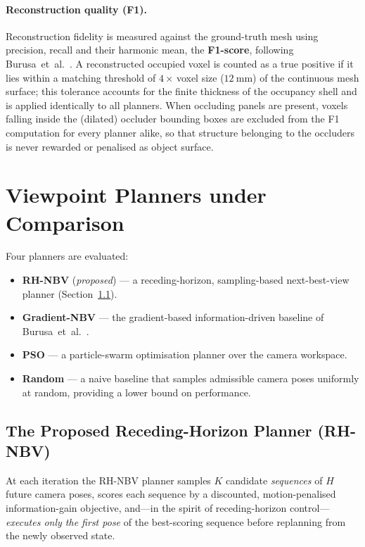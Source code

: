 \paragraph{Reconstruction quality (F1).}
Reconstruction fidelity is measured against the ground-truth mesh using
precision, recall and their harmonic mean, the \textbf{F1-score}, following
Burusa~et~al.~\cite{burusa2024}. A reconstructed occupied voxel is counted
as a true positive if it lies within a matching threshold of
$4\times$\,voxel size ($\SI{12}{\milli\meter}$) of the continuous mesh
surface; this tolerance accounts for the finite thickness of the occupancy
shell and is applied identically to all planners. When occluding panels are
present, voxels falling inside the (dilated) occluder bounding boxes are
excluded from the F1 computation for every planner alike, so that structure
belonging to the occluders is never rewarded or penalised as object
surface.

\section{Viewpoint Planners under Comparison}
\label{sec:planners}

Four planners are evaluated:

\begin{itemize}
  \item \textbf{RH-NBV} (\emph{proposed}) --- a receding-horizon,
        sampling-based next-best-view planner (Section~\ref{sec:rh}).
  \item \textbf{Gradient-NBV} --- the gradient-based information-driven
        baseline of Burusa~et~al.~\cite{burusa2024}.
  \item \textbf{PSO} --- a particle-swarm optimisation planner over the
        camera workspace.
  \item \textbf{Random} --- a naive baseline that samples admissible camera
        poses uniformly at random, providing a lower bound on performance.
\end{itemize}

\subsection{The Proposed Receding-Horizon Planner (RH-NBV)}
\label{sec:rh}

At each iteration the RH-NBV planner samples $K$ candidate \emph{sequences}
of $H$ future camera poses, scores each sequence by a discounted,
motion-penalised information-gain objective, and---in the spirit of
receding-horizon control---\emph{executes only the first pose} of the
best-scoring sequence before replanning from the newly observed state.

